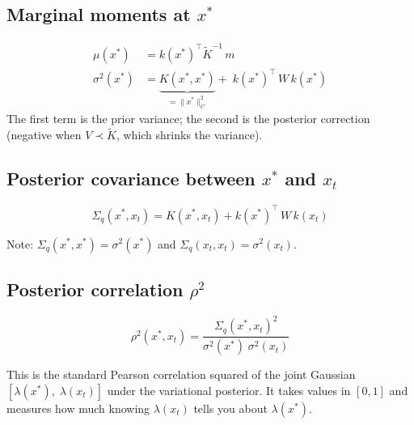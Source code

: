 \documentclass[11pt]{article}
\begin{document}
\subsection{Marginal moments at $x^*$}

\begin{align}
    \mu(x^*) &= k(x^*)^\top \tilde K^{-1}\, m
        \label{eq:mu} \\[6pt]
    \sigma^2(x^*) &= \underbrace{K(x^*,x^*)}_{= \|x^*\|_C^2}
        + \; k(x^*)^\top\, W\, k(x^*)
        \label{eq:sigma2}
\end{align}
The first term is the prior variance; the second is the posterior
correction (negative when $V \prec \tilde K$, which shrinks the variance).

\subsection{Posterior covariance between $x^*$ and $x_t$}

\begin{equation}\label{eq:cov}
    \Sigma_q(x^*, x_t) = K(x^*, x_t) + k(x^*)^\top\, W\, k(x_t)
\end{equation}

Note: $\Sigma_q(x^*, x^*) = \sigma^2(x^*)$ and $\Sigma_q(x_t, x_t) = \sigma^2(x_t)$.

\subsection{Posterior correlation $\rho^2$}

\begin{equation}\label{eq:rho2}
    \boxed{\;
    \rho^2(x^*, x_t)
    = \frac{\Sigma_q(x^*, x_t)^2}
           {\sigma^2(x^*)\;\sigma^2(x_t)}
    \;}
\end{equation}

This is the standard Pearson correlation squared of the joint Gaussian
$[\lambda(x^*),\;\lambda(x_t)]$ under the variational posterior.
It takes values in $[0, 1]$ and measures how much knowing
$\lambda(x_t)$ tells you about $\lambda(x^*)$.
\end{document}

